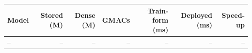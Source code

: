 \begin{tabular}{lrrrrrr}
\toprule
Model & Stored (M) & Dense (M) & GMACs & Train-form (ms) & Deployed (ms) & Speed-up \\
\midrule
-- & -- & -- & -- & -- & -- & -- \\
\bottomrule
\end{tabular}
